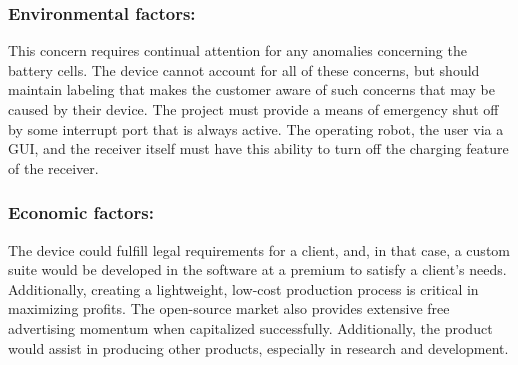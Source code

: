 \documentclass[12pt]{article}
\begin{document}
\subsubsection{Environmental factors:}
This concern requires continual attention for any anomalies concerning the battery cells.  The device cannot account for all of these concerns, but should maintain labeling that makes the customer aware of such concerns that may be caused by their device.  The project must provide a means of emergency shut off by some interrupt port that is always active.  The operating robot, the user via a GUI, and the receiver itself must have this ability to turn off the charging feature of the receiver.

\subsubsection{Economic factors:}
The device could fulfill legal requirements for a client, and, in that case, a custom suite would be developed in the software at a premium to satisfy a client's needs.  Additionally, creating a lightweight, low-cost production process is critical in maximizing profits.  The open-source market also provides extensive free advertising momentum when capitalized successfully.  Additionally, the product would assist in producing other products, especially in research and development. \\

\hfill
\end{document}
